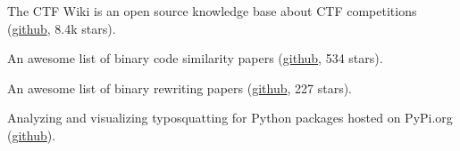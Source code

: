 \shorterSection{\textcolor{titleblue}{Projects}}
\resumeSubHeadingListStart
{} {%
	The CTF Wiki is an open source knowledge base about CTF competitions
	(\href{https://github.com/ctf-wiki/ctf-wiki}{\textcolor{linkblue}{github}}, 8.4k stars).
}

 {%
	An awesome list of binary code similarity papers
	(\href{https://github.com/SystemSecurityStorm/Awesome-Binary-Similarity}{\textcolor{linkblue}{github}}, 534 stars).
}

 {%
	An awesome list of binary rewriting papers
	(\href{https://github.com/SystemSecurityStorm/Awesome-Binary-Rewriting}{\textcolor{linkblue}{github}}, 227 stars).
}

 {%
	Analyzing and visualizing typosquatting for Python packages hosted on PyPi.org
	(\href{https://github.com/Vancir/PyPi-Typosquatting-Graph}{\textcolor{linkblue}{github}}).
}


\resumeSubHeadingListEnd
